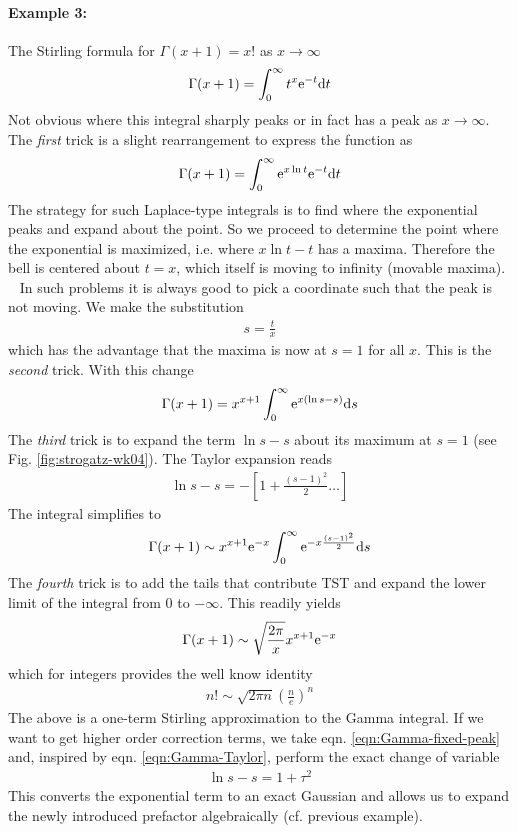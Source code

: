 \paragraph{Example 3:} The Stirling formula for $\Gamma(x+1)=x!$ as $x \rightarrow \infty$
\begin{gather*}
	\Gamma(x+1) = \int_{0}^{\infty} t^x \mathrm{e}^{-t} \mathrm{d} t
\end{gather*}
Not obvious where this integral sharply peaks or in fact has a peak as $x \rightarrow \infty$. The \emph{first} trick is a slight rearrangement to express the function as
\begin{align*}
	\Gamma(x+1) = \int_{0}^{\infty} \mathrm{e}^{x \ln t} \mathrm{e}^{-t} \mathrm{d} t
\end{align*}
The strategy for such Laplace-type integrals is to find where the exponential peaks and expand about the point. So we proceed to determine the point where the exponential is maximized, i.e. where $x \ln t - t$ has a maxima. Therefore the bell is centered about $t=x$, which itself is moving to infinity (movable maxima). \\
\ \newline
In such problems it is always good to pick a coordinate such that the peak is not moving. We make the substitution
\begin{gather*}
	s = \frac{t}{x}
\end{gather*}
which has the advantage that the maxima is now at $s=1$ for all $x$. This is the \emph{second} trick. With this change
\begin{align}
	\Gamma(x+1) = x^{x+1} \int_{0}^{\infty} \mathrm{e}^{x (\ln s - s)} \mathrm{d} s \label{eqn:Gamma-fixed-peak}
\end{align}
The \emph{third} trick is to expand the term $\ln s - s$ about its maximum at $s=1$ (see Fig. \ref{fig:strogatz-wk04}). The Taylor expansion reads
\begin{align}\label{eqn:Gamma-Taylor}
	\ln s -s = - \left[1+ \frac{(s-1)^2}{2} \dots \right]
\end{align}
The integral simplifies to
\begin{align*}
	\Gamma(x+1) \sim x^{x+1} \mathrm{e}^{-x} \int_{0}^{\infty} \mathrm{e}^{-x\frac{(s-1)^2}{2}} \mathrm{d} s
\end{align*}
The \emph{fourth} trick is to add the tails that contribute TST and expand the lower limit of the integral from 0 to $-\infty$. This readily yields
\begin{align}\label{eqn:stirling-approx}
	\Gamma(x+1) \sim \sqrt{\frac{2\pi}{x}}x^{x+1}\mathrm{e}^{-x}
\end{align}
which for integers provides the well know identity
\begin{gather}
	n! \sim \sqrt{2\pi n} \left(\frac{n}{e}\right)^n
\end{gather}
The above is a one-term Stirling approximation to the Gamma integral. If we want to get higher order correction terms, we take eqn. \ref{eqn:Gamma-fixed-peak} and, inspired by eqn. \ref{eqn:Gamma-Taylor}, perform the exact change of variable
\begin{align*}
	\ln s - s = 1 + \tau^2
\end{align*}
This converts the exponential term to an exact Gaussian and allows us to expand the newly introduced prefactor algebraically (cf. previous example).  


